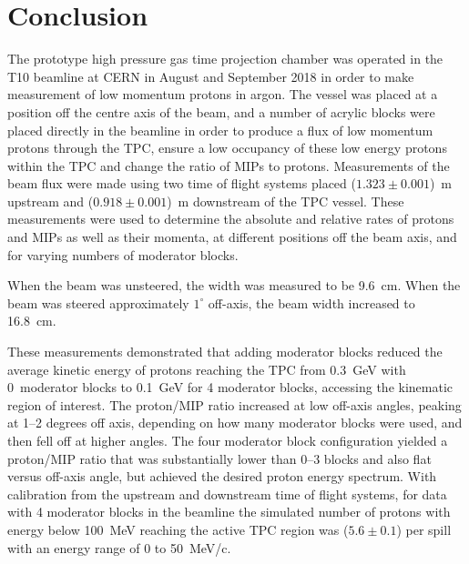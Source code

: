 \section{Conclusion}
\label{hptpcPaper:sec:Conclusion}

The prototype high pressure gas time projection chamber was operated in the T10 beamline at CERN in August and September 2018 in order to make measurement of low momentum protons in argon.
The vessel was placed at a position off the centre axis of the beam, and a number of acrylic blocks were placed directly in the beamline in order to produce a flux of low momentum protons through the TPC, ensure a low occupancy of these low energy protons within the TPC and change the ratio of MIPs to protons.
Measurements of the beam flux were made using two time of flight systems placed ($1.323 \pm 0.001$)~m upstream and ($0.918 \pm 0.001$)~m downstream of the TPC vessel.
These measurements were used to determine the absolute and relative rates of protons and MIPs as well as their momenta, at different positions off the beam axis, and for varying numbers of moderator blocks.

When the beam was unsteered, the width was measured to be 9.6~cm.
When the beam was steered approximately $1^{\circ}$ off-axis, the beam width increased to 16.8~cm.

These measurements demonstrated that adding moderator blocks reduced the average kinetic energy of protons reaching the TPC from 0.3~GeV with 0~moderator blocks to 0.1~GeV for 4 moderator blocks, accessing the kinematic region of interest.
The proton/MIP ratio increased at low off-axis angles, peaking at 1–2 degrees off axis, depending on how many moderator blocks were used, and then fell off at higher angles.
The four moderator block configuration yielded a proton/MIP ratio that was  substantially lower than 0–3 blocks and also flat versus off-axis angle, but achieved the desired proton energy spectrum.
With calibration from the upstream and downstream time of flight systems, for data with 4 moderator blocks in the beamline the simulated number of protons with energy below 100~MeV reaching the active TPC region was ($5.6 \pm  0.1$) per spill with an energy range of 0 to 50~MeV/c.


